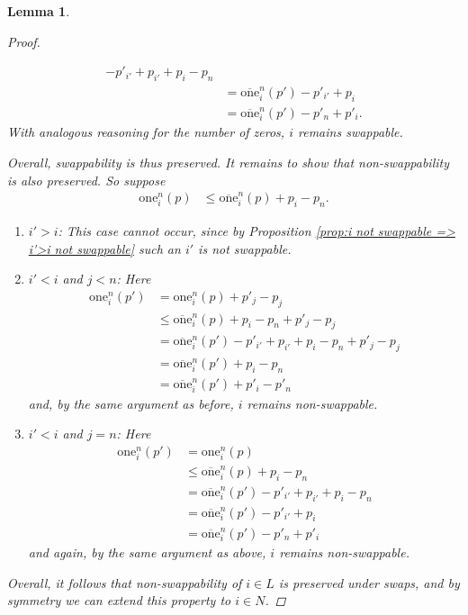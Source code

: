 \documentclass[12pt]{article}
\newtheorem{lem}[thm]{Lemma}
\begin{document}
\begin{lem}
\begin{proof}
\begin{enumerate}
\begin{align*}
- p'_{i'} + p_{i'}
 + p_i-p_n
\\
&=
\overline{\mathrm{one}}_i^n(p')
-p'_{i'} + p_{i}
\\
&=
\overline{\mathrm{one}}_i^n(p')
-p'_{n} + p'_{i}.
\end{align*}
With analogous reasoning for the number of zeros, $i$ remains swappable.
\end{enumerate}
Overall, swappability is thus preserved. It remains to show that non-swappability is also preserved. So suppose
\begin{align*}
\mathrm{one}_i^{n}(p)
&\leq
\overline{\mathrm{one}}_i^{n}(p)
+
p_i-p_n.
\end{align*}
\begin{enumerate}
\item
$i'>i$: This case cannot occur, since by Proposition \ref{prop:i not swappable => i'>i not swappable} such an $i'$ is not swappable.

\item
$i'<i$ and $j<n$:
Here
\begin{align*}
\mathrm{one}_{i}^{n}(p')
&=
\mathrm{one}_{i}^{n}(p)
+ p'_j - p_j
\\
&\leq
\overline{\mathrm{one}}_i^{n}(p)
+ p_i - p_n
+ p'_j - p_j
\\
&=
\overline{\mathrm{one}}_i^{n}(p')
-p'_{i'} + p_{i'}
+ p_i - p_n
+ p'_j - p_j
\\
&=
\overline{\mathrm{one}}_i^{n}(p')
+ p_i - p_n
\\
&=
\overline{\mathrm{one}}_i^{n}(p')
+ p'_i - p'_n
\end{align*}
and, by the same argument as before, $i$ remains non-swappable.

\item $i'<i$ and $j=n$:
Here
\begin{align*}
\mathrm{one}_{i}^{n}(p')
&=
\mathrm{one}_{i}^{n}(p)
\\
&\leq
\overline{\mathrm{one}}_i^{n}(p)
+ p_i - p_n
\\
&=
\overline{\mathrm{one}}_i^{n}(p')
-p'_{i'} + p_{i'}
+ p_i - p_n
\\
&=
\overline{\mathrm{one}}_i^{n}(p')
-p'_{i'} + p_{i} 
\\
&=
\overline{\mathrm{one}}_i^{n}(p')
- p'_n + p'_i
\end{align*}
and again, by the same argument as above, $i$ remains non-swappable.
\end{enumerate}
Overall, it follows that non-swappability of $i\in L$ is preserved under swaps, and by symmetry we can extend this property to $i\in N$.
\end{proof}

\label{lem:swappable once swappable always}
\end{lem}
\end{document}
